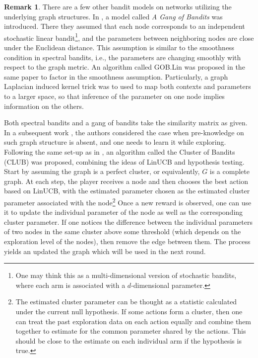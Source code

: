 \documentclass[letterpaper,11pt,openright,openany]{book}
\numberwithin{equation}{section}
\theoremstyle{plain}
\theoremstyle{definition}
\newtheorem{Rem}[Th]{Remark}
\begin{document}
\begin{Rem}
There are a few other bandit models on networks utilizing the underlying graph structures. In \cite{cesa2013gang}, a model called \emph{A Gang of Bandits} was introduced. There they assumed that each node corresponds to an independent stochastic linear bandit\footnote{One may think this as a multi-dimensional version of stochastic bandits, where each arm is associated with a $d$-dimensional parameter.}, and the parameters between neighboring nodes are close under the Euclidean distance. This assumption is similar to the smoothness condition in spectral bandits, i.e., the parameters are changing smoothly with respect to the graph metric. An algorithm called GOB.Lin was proposed in the same paper to factor in the smoothness assumption. Particularly, a graph Laplacian induced kernel trick was to used to map both contexts and parameters to a larger space, so that inference of the parameter on one node implies information on the others.  

Both spectral bandits and a gang of bandits take the similarity matrix as given. In a subsequent work \cite{gentile2014online}, the authors considered the case when pre-knowledge on such graph structure is absent, and one needs to learn it while exploring. 
Following the same set-up as in \cite{cesa2013gang}, an algorithm called the Cluster of Bandits (CLUB) was proposed, combining the ideas of LinUCB and hypothesis testing. 
Start by assuming the graph is a perfect cluster, or equivalently,  $G$ is a complete graph. At each step, the player receives a node and then chooses the best action based on LinUCB, with the estimated parameter chosen as the estimated cluster parameter associated with the node\footnote{The estimated cluster parameter can be thought as a statistic calculated under the current null hypothesis. If some actions form a cluster, then one can treat the past exploration data on each action equally and combine them together to estimate for the common parameter shared by the actions. This should be close to the estimate on each individual arm if the hypothesis is true.} 
Once a new reward is observed, one can use it to update the individual parameter of the node as well as the corresponding cluster parameter. If one notices the difference between the individual parameters of two nodes in the same cluster above some threshold (which depends on the exploration level of the nodes), then remove the edge between them. The process yields an updated the graph which will be used in the next round. 
\end{Rem}
\end{document}
